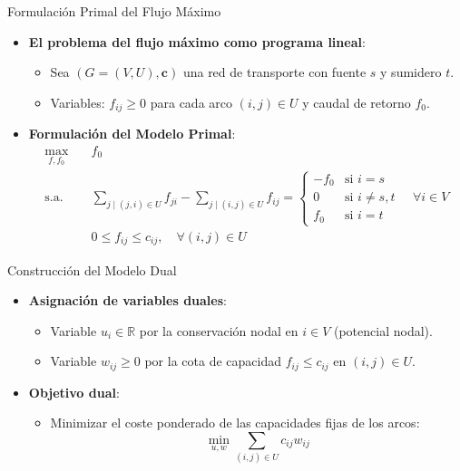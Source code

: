\documentclass[
  ignorenonframetext,
]{beamer}
\providecommand{\tightlist}{%
  \setlength{\itemsep}{0pt}\setlength{\parskip}{0pt}}
\begin{document}
\begin{frame}{Formulación Primal del Flujo Máximo}
\label{formulaciuxf3n-primal-del-flujo-muxe1ximo}
\begin{itemize}
\tightlist
\item
  \textbf{El problema del flujo máximo como programa lineal}:

  \begin{itemize}
  \tightlist
  \item
    Sea \((G = (V, U), \mathbf{c})\) una red de transporte con fuente
    \(s\) y sumidero \(t\).
  \item
    Variables: \(f_{ij} \ge 0\) para cada arco \((i,j) \in U\) y caudal
    de retorno \(f_0\).
  \end{itemize}
\item
  \textbf{Formulación del Modelo Primal}: \[
  \begin{aligned}
  \max_{f, f_0} \quad & f_0 \\
  \text{s.a.} \quad & \sum_{j \mid (j, i) \in U} f_{ji} - \sum_{j \mid (i, j) \in U} f_{ij} = \begin{cases} -f_0 & \text{si } i = s \\ 0 & \text{si } i \neq s, t \\ f_0 & \text{si } i = t \end{cases} \quad \forall i \in V \\
  & 0 \le f_{ij} \le c_{ij}, \quad \forall (i, j) \in U
  \end{aligned}
  \]
\end{itemize}
\end{frame}

\begin{frame}{Construcción del Modelo Dual}
\label{construcciuxf3n-del-modelo-dual}
\begin{itemize}
\tightlist
\item
  \textbf{Asignación de variables duales}:

  \begin{itemize}
  \tightlist
  \item
    Variable \(u_i \in \mathbb{R}\) por la conservación nodal en
    \(i \in V\) (potencial nodal).
  \item
    Variable \(w_{ij} \ge 0\) por la cota de capacidad
    \(f_{ij} \le c_{ij}\) en \((i, j) \in U\).
  \end{itemize}
\item
  \textbf{Objetivo dual}:

  \begin{itemize}
  \tightlist
  \item
    Minimizar el coste ponderado de las capacidades fijas de los arcos:
    \[\min_{u, w} \sum_{(i,j) \in U} c_{ij} w_{ij}\]
  \end{itemize}
\end{itemize}
\end{frame}
\end{document}

